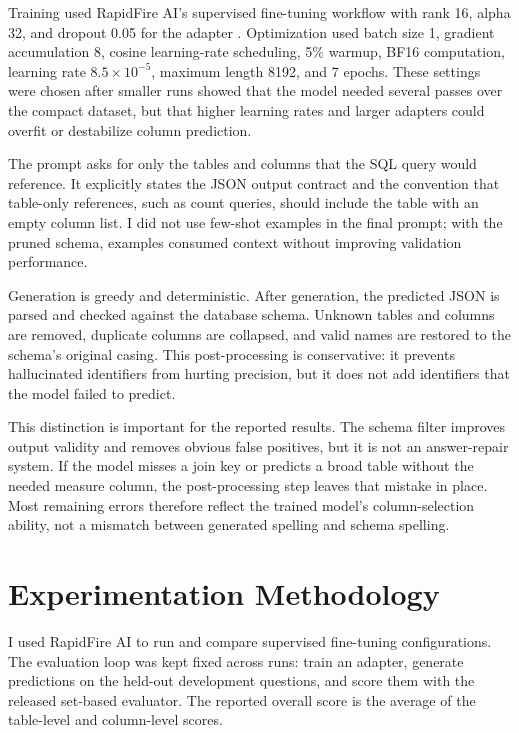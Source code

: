 \documentclass{article}
\begin{document}
Training used RapidFire AI's supervised fine-tuning workflow with rank 16, alpha 32, and dropout
0.05 for the adapter \cite{hu2021lora,dettmers2023qlora}. Optimization used batch size 1, gradient
accumulation 8, cosine learning-rate scheduling, 5\% warmup, BF16 computation, learning rate
\(8.5\times 10^{-5}\), maximum length 8192, and 7 epochs. These settings were chosen after smaller
runs showed that the model needed several passes over the compact dataset, but that higher learning
rates and larger adapters could overfit or destabilize column prediction.

The prompt asks for only the tables and columns that the SQL query would reference. It explicitly
states the JSON output contract and the convention that table-only references, such as count queries,
should include the table with an empty column list. I did not use few-shot examples in the final prompt;
with the pruned schema, examples consumed context without improving validation performance.

Generation is greedy and deterministic. After generation, the predicted JSON is parsed and checked
against the database schema. Unknown tables and columns are removed, duplicate columns are
collapsed, and valid names are restored to the schema's original casing. This post-processing is
conservative: it prevents hallucinated identifiers from hurting precision, but it does not add identifiers
that the model failed to predict.

This distinction is important for the reported results. The schema filter improves output validity and
removes obvious false positives, but it is not an answer-repair system. If the model misses a join key
or predicts a broad table without the needed measure column, the post-processing step leaves that
mistake in place. Most remaining errors therefore reflect the trained model's column-selection ability,
not a mismatch between generated spelling and schema spelling.

\section{Experimentation Methodology}

I used RapidFire AI to run and compare supervised fine-tuning configurations. The evaluation loop was
kept fixed across runs: train an adapter, generate predictions on the held-out development questions,
and score them with the released set-based evaluator. The reported overall score is the average of
the table-level and column-level scores.
\end{document}
